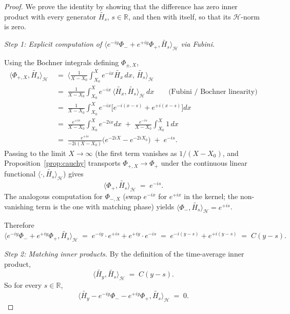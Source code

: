 \documentclass[11pt]{article}
\theoremstyle{definition}
\theoremstyle{remark}
\begin{document}
\begin{proof}
We prove the identity by showing that the difference has zero inner product with every generator $\widetilde{H_s}$, $s\in\mathbb{R}$, and then with itself, so that its $\mathcal{H}$-norm is zero.

\emph{Step 1: Explicit computation of $\langle e^{-iy}\Phi_-+e^{+iy}\Phi_+,\widetilde{H_s}\rangle_\mathcal{H}$ via Fubini.}

Using the Bochner integrals defining $\Phi_{\pm,X}$,
\begin{align*}
  \langle \Phi_{+,X},\widetilde{H_s}\rangle_\mathcal{H}
  &\;=\;\Big\langle\frac{1}{X-X_0}\int_{X_0}^X e^{-ix}\widetilde{H_x}\,dx,\,\widetilde{H_s}\Big\rangle_\mathcal{H}\\
  &\;=\;\frac{1}{X-X_0}\int_{X_0}^X e^{-ix}\,\langle\widetilde{H_x},\widetilde{H_s}\rangle_\mathcal{H}\,dx\qquad\text{(Fubini / Bochner linearity)}\\
  &\;=\;\frac{1}{X-X_0}\int_{X_0}^X e^{-ix}\bigl[e^{-i(x-s)}+e^{+i(x-s)}\bigr]dx\\
  &\;=\;\frac{e^{+is}}{X-X_0}\int_{X_0}^X e^{-2ix}dx\;+\;\frac{e^{-is}}{X-X_0}\int_{X_0}^X 1\,dx\\
  &\;=\;\frac{e^{+is}}{-2i(X-X_0)}\bigl(e^{-2iX}-e^{-2iX_0}\bigr)\;+\;e^{-is}.
\end{align*}
Passing to the limit $X\to\infty$ (the first term vanishes as $1/(X-X_0)$, and Proposition~\ref{prop:cauchy} transports $\Phi_{+,X}\to\Phi_+$ under the continuous linear functional $\langle\cdot,\widetilde{H_s}\rangle_\mathcal{H}$) gives
\[
  \langle\Phi_+,\widetilde{H_s}\rangle_\mathcal{H}\;=\;e^{-is}.
\]
The analogous computation for $\Phi_{-,X}$ (swap $e^{-ix}$ for $e^{+ix}$ in the kernel; the non-vanishing term is the one with matching phase) yields $\langle\Phi_-,\widetilde{H_s}\rangle_\mathcal{H}=e^{+is}$.

Therefore
\[
  \langle e^{-iy}\Phi_-+e^{+iy}\Phi_+,\widetilde{H_s}\rangle_\mathcal{H}\;=\;e^{-iy}\cdot e^{+is}+e^{+iy}\cdot e^{-is}\;=\;e^{-i(y-s)}+e^{+i(y-s)}\;=\;C(y-s).
\]

\emph{Step 2: Matching inner products.} By the definition of the time-average inner product,
\[
  \langle\widetilde{H_y},\widetilde{H_s}\rangle_\mathcal{H}\;=\;C(y-s).
\]
So for every $s\in\mathbb{R}$,
\[
  \langle\widetilde{H_y}-e^{-iy}\Phi_--e^{+iy}\Phi_+,\widetilde{H_s}\rangle_\mathcal{H}\;=\;0.
\]


\end{proof}
\end{document}
